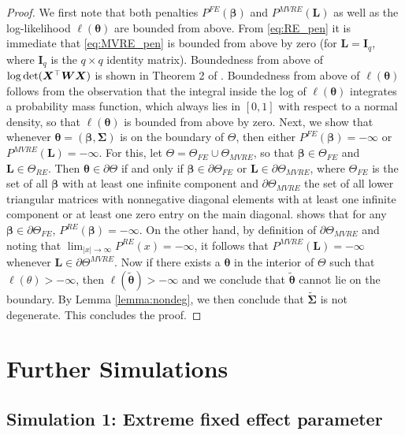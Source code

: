 \documentclass[11pt, a4paper]{article}
\newcommand*{\bb}{\boldsymbol}
\theoremstyle{example} \newtheorem{example}{Example}[section]
\theoremstyle{theorem} \newtheorem{theorem}{Theorem}[section]
\theoremstyle{theorem }\newtheorem{proposition}{Proposition}[section]
\theoremstyle{theorem }\newtheorem{corollary}{Corollary}[section]
\def\det{{\mathop{\rm det}}}
\def\btheta{\bb{\theta}}
\def\bSigma{\bb{\Sigma}}
\def\bX{\bb{X}}
\def\bL{\bb{L}}
\def\bttilde{\tilde{\bb{\theta}}}
\def\bW{\bb{W}}
\begin{document}
\begin{proof}
	We first note that both penalties $P^\textit{FE}(\bb \beta)$ and $P^\textit{MVRE}(\bb L)$ as well as the log-likelihood $\ell(\bb \theta)$ are bounded from above. From \eqref{eq:RE_pen} it is immediate that \eqref{eq:MVRE_pen} is bounded from above by zero (for $\bb L= {\bb I}_q$, where ${\bb I}_q$ is the $q\times q$ identity matrix). Boundedness from above of $\log \det(\bX^\top \bW \bX)$ is shown in Theorem 2 of \citet{kosmidis2021jeffreys}. Boundedness from above of $\ell(\bb \theta)$ follows from the observation that the integral inside the log of $\ell(\bb \theta)$ integrates a probability mass function, which always lies in $[0,1]$ with respect to a normal density, so that $\ell(\bb \theta)$ is bounded from above by zero. Next, we show that whenever $\btheta =(\bb \beta,\bSigma)$ is on the boundary of $\Theta$, then either $P^\textit{FE}(\bb \beta) = - \infty$ or $P^\textit{MVRE}(\bL) = -\infty$. For this, let $\Theta = \Theta_\textit{FE} \cup \Theta_\textit{MVRE}$, so that $\bb \beta \in \Theta_\textit{FE}$ and $\bL \in \Theta_\textit{RE}$. Then $\btheta \in \partial \Theta$ if and only if $\bb \beta \in \partial \Theta_\textit{FE} $ or $ \bL \in \partial \Theta_\textit{MVRE}$, where $\Theta_\textit{FE}$ is the set of all $\bb \beta$ with at least one infinite component and $\partial \Theta_\textit{MVRE}$ the set of all lower triangular matrices with nonnegative diagonal elements with at least one infinite component or at least one zero entry on the main diagonal. \citet{kosmidis2021jeffreys} shows that for any $\bb{ \beta} \in \partial\Theta_\textit{FE}$, $P^\textit{RE}(\bb \beta) = -\infty$. On the other hand, by definition of $\partial \Theta_\textit{MVRE}$ and noting that $\lim_{|x| \to \infty} P^\textit{RE}(x) = - \infty $, it follows that $P^\textit{MVRE}(\bL)=-\infty$ whenever $\bL \in \partial \Theta^\textit{MVRE}$. Now if there exists a $\btheta$ in the interior of $\Theta$ such that $\ell(\theta)>-\infty$, then $\ell(\bttilde) >-\infty$ and we conclude that $\bttilde$ cannot lie on the boundary. By Lemma \ref{lemma:nondeg}, we then conclude that $\tilde{\bSigma}$ is not degenerate. This concludes the proof.
\end{proof} 

\section{Further Simulations} \label{sec:simuls}

\subsection{Simulation 1: Extreme fixed effect parameter}\label{sec:sim1}
\end{document}
